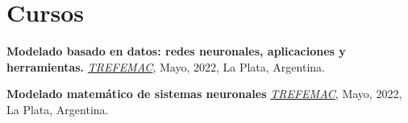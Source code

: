 \documentclass[a4paper,10pt]{article}
\begin{document}
\begin{adjustbox}{valign=t}
\begin{minipage}{0.5\textwidth}
\begin{description}
\end{description}

\vspace*{-.6cm}
\section*{Cursos}
\begin{description}
    \raggedright
    \item \textbf{Modelado basado en datos: redes neuronales, aplicaciones y herramientas.} 
	{\href{https://sites.google.com/view/trefemac2022}{\it TREFEMAC}}, Mayo, 2022, La Plata, Argentina.
    \item \textbf{Modelado matemático de sistemas neuronales} {\href{https://sites.google.com/view/trefemac2022}{\it TREFEMAC}}, Mayo, 2022, La Plata, Argentina.
\end{description}

\MySkip

\LastUpdate

\end{minipage}
\end{adjustbox}
\end{document}
